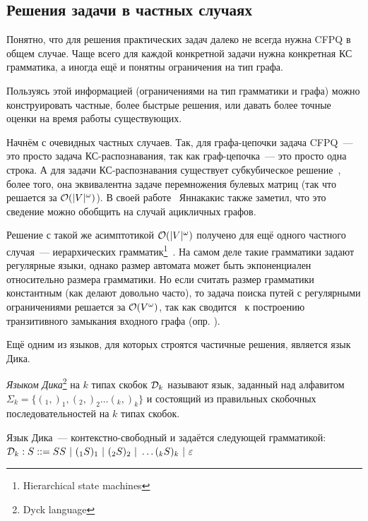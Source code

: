 \subsection{Решения задачи в частных случаях}

Понятно, что для решения практических задач далеко не всегда нужна CFPQ в общем случае. Чаще всего для каждой конкретной задачи нужна конкретная КС грамматика, а иногда ещё и понятны ограничения на тип графа.

Пользуясь этой информацией (ограничениями на тип грамматики и графа) можно конструировать частные, более быстрые решения, или давать более точные оценки на время работы существующих. 

Начнём с очевидных частных случаев. Так, для графа-цепочки задача CFPQ~--- это просто задача КС-распознавания, так как граф-цепочка~--- это просто одна строка. А для задачи КС-распознавания существует субкубическое решение~\cite{Valiant1975}, более того, она эквивалентна задаче перемножения булевых матриц (так что решается за $\mathcal{O}(|V|^{\omega})$). В своей работе~\cite{Yannakakis1990} Яннакакис также заметил, что это сведение можно обобщить на случай ацикличных графов.

Решение с такой же асимптотикой $\mathcal{O}(|V|^{\omega})$ получено для ещё одного частного случая~--- иерархических грамматик\footnote{Hierarchical state machines}~\cite{Yannakakis00}. На самом деле такие грамматики задают регулярные языки, однако размер автомата может быть экпоненциален относительно размера грамматики. Но если считать размер грамматики константным (как делают довольно часто), то задача поиска путей с регулярными ограничениями решается за $\mathcal{O}(V^{\omega})$, так как сводится~\cite{Yannakakis1990} к построению транзитивного замыкания входного графа (опр. \TODO).

Ещё одним из языков, для которых строятся частичные решения, является язык Дика.

\begin{definition}\label{def:dyck}
  \textit{Языком Дика}\footnote{Dyck language} на $k$ типах скобок $\mathcal{D}_k$ называют язык, заданный над алфавитом $\Sigma_k = \{ (_1, )_1, (_2, )_2 \dots (_k, )_k \}$ и состоящий из правильных скобочных последовательностей на $k$ типах скобок.

  Язык Дика~--- контекстно-свободный и задаётся следующей грамматикой:\\ $\mathcal{D}_k : S ::= S S~|~(_1 S )_1 ~|~ (_2 S )_2~|~ \dots (_k S )_k ~|~ \varepsilon$

\end{definition}

